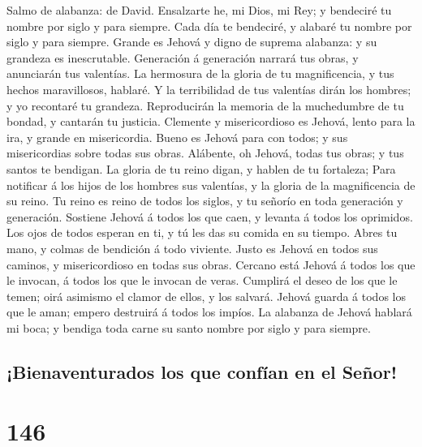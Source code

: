  Salmo de alabanza: de David. Ensalzarte he, mi Dios, mi
Rey; y bendeciré tu nombre por siglo y para siempre.  Cada
día te bendeciré, y alabaré tu nombre por siglo y para siempre.
 Grande es Jehová y digno de suprema alabanza: y su
grandeza es inescrutable.  Generación á generación narrará
tus obras, y anunciarán tus valentías.  La hermosura de la
gloria de tu magnificencia, y tus hechos maravillosos, hablaré.
 Y la terribilidad de tus valentías dirán los hombres; y
yo recontaré tu grandeza.  Reproducirán la memoria de la
muchedumbre de tu bondad, y cantarán tu justicia. 
Clemente y misericordioso es Jehová, lento para la ira, y grande en
misericordia.  Bueno es Jehová para con todos; y sus
misericordias sobre todas sus obras.  Alábente, oh
Jehová, todas tus obras; y tus santos te bendigan.  La
gloria de tu reino digan, y hablen de tu fortaleza;  Para
notificar á los hijos de los hombres sus valentías, y la gloria de la
magnificencia de su reino.  Tu reino es reino de todos
los siglos, y tu señorío en toda generación y generación.
 Sostiene Jehová á todos los que caen, y levanta á todos
los oprimidos.  Los ojos de todos esperan en ti, y tú les
das su comida en su tiempo.  Abres tu mano, y colmas de
bendición á todo viviente.  Justo es Jehová en todos sus
caminos, y misericordioso en todas sus obras.  Cercano
está Jehová á todos los que le invocan, á todos los que le invocan de
veras.  Cumplirá el deseo de los que le temen; oirá
asimismo el clamor de ellos, y los salvará.  Jehová
guarda á todos los que le aman; empero destruirá á todos los impíos.
 La alabanza de Jehová hablará mi boca; y bendiga toda
carne su santo nombre por siglo y para siempre.

\hypertarget{bienaventurados-los-que-confuxedan-en-el-seuxf1or}{%
\subsection{¡Bienaventurados los que confían en el
Señor!}\label{bienaventurados-los-que-confuxedan-en-el-seuxf1or}}

\hypertarget{section-145}{%
\section{146}\label{section-145}}


